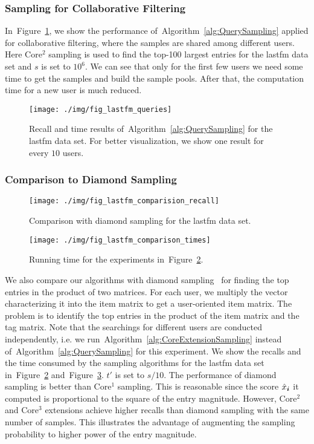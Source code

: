 \documentclass[letterpaper]{article}
\newcommand{\V}[1]{{\boldsymbol{{\MakeLowercase{#1}}}}}
\newcommand{\Fig}[1]{Figure~\ref{fig:#1}}
\newcommand{\Alg}[1]{Algorithm~\ref{alg:#1}}
\begin{document}
\subsubsection{Sampling for Collaborative Filtering}
In~\Fig{Queries}, we show the performance of~\Alg{QuerySampling}
applied for collaborative filtering,
where the samples are shared among different users.
Here Core$^2$ sampling is used to find the top-100 largest entries for the lastfm data set
and $s$ is set to $10^6$.
We can see that only for the first few users we need some time to get the samples
and build the sample pools.
After that, the computation time for a new user is much reduced.
\begin{figure}[!]
  \centering
  \texttt{[image: ./img/fig\_lastfm\_queries]}\\
  \caption{Recall and time results of~\Alg{QuerySampling} for the lastfm data set.
           For better visualization, we show one result for every $10$ users.}
  \label{fig:Queries}
\end{figure}
\subsubsection{Comparison to Diamond Sampling}
\begin{figure}[!ht]
  \centering
  \texttt{[image: ./img/fig\_lastfm\_comparision\_recall]}\\
  \caption{Comparison with diamond sampling for the lastfm data set.}
  \label{fig:Comparison_recall}
\end{figure}
\begin{figure}[!ht]
    \centering
    \texttt{[image: ./img/fig\_lastfm\_comparison\_times]}\\
    \caption{Running time for the experiments in~\Fig{Comparison_recall}.}
\label{fig:Comparison_time}
\end{figure}
We also compare our algorithms with diamond sampling~\cite{BaPiKoSe15}
for finding the top entries in the product of two matrices.
For each user, we multiply the vector characterizing it into the item matrix
to get a user-oriented item matrix.
The problem is to identify the top entries in the product of the item matrix and the tag matrix.
Note that the searchings for different users are conducted independently,
i.e. we run~\Alg{CoreExtensionSampling} instead of~\Alg{QuerySampling} for this experiment.
We show the recalls and the time consumed by the sampling algorithms for the lastfm data set
in~\Fig{Comparison_recall} and~\Fig{Comparison_time}.
$t'$ is set to $s/10$.
The performance of diamond sampling is better than Core$^1$ sampling.
This is reasonable since the score $\hat{x}_{\V{i}}$ it computed is proportional to the square of the entry magnitude.
However, Core$^2$ and Core$^3$ extensions achieve higher recalls than diamond sampling with the same number of samples.
This illustrates the advantage of augmenting the sampling probability to higher power of the entry magnitude.





\end{document}
